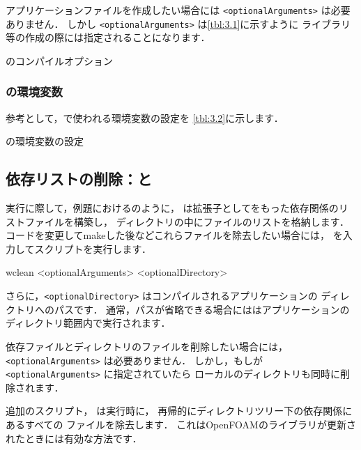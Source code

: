 アプリケーションファイルを作成したい場合には \texttt{<optionalArguments>} は必要ありません．
しかし \texttt{<optionalArguments>} は\autoref{tbl:3.1}に示すように
ライブラリ等の作成の際には指定されることになります．


\begin{table}[ht]
 
 \caption{のコンパイルオプション}
 \label{tbl:3.1}
\end{table}


\subsubsection{の環境変数}
\label{sssec:3.2.2.5}
参考として，で使われる環境変数の設定を
\autoref{tbl:3.2}に示します．


\begin{table}[ht]
 
 \caption{の環境変数の設定}
 \label{tbl:3.2}
\end{table}


\subsection{依存リストの削除：と}
\label{ssec:3.2.3}
実行に際して，例題におけるのように，
は拡張子としてをもった依存関係のリストファイルを構築し，
ディレクトリの中にファイルのリストを格納します．
コードを変更してmakeした後などこれらファイルを除去したい場合には，
%
%
を入力してスクリプトを実行します．
\begin{OFverbatim}[terminal]
wclean <optionalArguments> <optionalDirectory>
\end{OFverbatim}
さらに，\texttt{<optionalDirectory>} はコンパイルされるアプリケーションの
ディレクトリへのパスです．
通常，パスが省略できる場合にははアプリケーションの
ディレクトリ範囲内で実行されます．

依存ファイルとディレクトリのファイルを削除したい場合には，
\texttt{<optionalArguments>} は必要ありません．
しかし，もしが \texttt{<optionalArguments>} に指定されていたら
ローカルのディレクトリも同時に削除されます．

追加のスクリプト，
%
%
は実行時に，
再帰的にディレクトリツリー下の依存関係にあるすべての
ファイルを除去します．
これはOpenFOAMのライブラリが更新されたときには有効な方法です．


